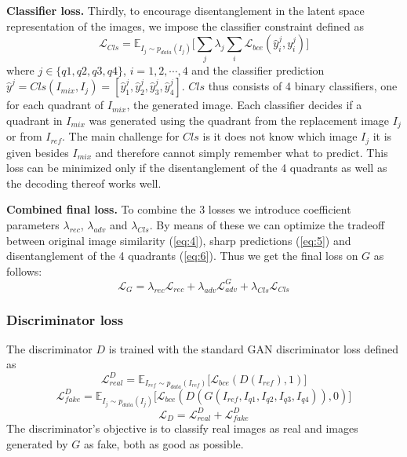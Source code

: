 \documentclass[12pt,a4paper]{article}
\begin{document}
\textbf{Classifier loss.} Thirdly, to encourage disentanglement in the latent space representation of the images, we impose the classifier constraint defined as
\begin{equation} \label{eq:cls}
    \mathcal{L}_{Cls} = \mathbb{E}_{I_{j}\sim p_{data} (I_{j})}\big[\sum_{j} \lambda_j \sum_{i} \mathcal{L}_{bce}(\hat{y}^j_i, y^j_i)\big]
\end{equation}
where $j \in \{q1,q2,q3,q4\}$, $i=1,2,\cdots,4$ and the classifier prediction $\hat{y}^j = Cls(I_{mix}, I_j) = [\hat{y}^j_1, \hat{y}^j_2, \hat{y}^j_3, \hat{y}^j_4]$. $Cls$ thus consists of 4 binary classifiers, one for each quadrant of $I_{mix}$, the generated image. Each classifier decides if a quadrant in $I_{mix}$ was generated using the quadrant from the replacement image $I_j$ or from $I_{ref}$. The main challenge for $Cls$ is it does not know which image $I_j$ it is given besides $I_{mix}$ and therefore cannot simply remember what to predict. This loss can be minimized only if the disentanglement of the 4 quadrants as well as the decoding thereof works well.

\textbf{Combined final loss.} To combine the 3 losses we introduce coefficient parameters $\lambda_{rec}$, $\lambda_{adv}$ and $\lambda_{Cls}$. By means of these we can optimize the tradeoff between original image similarity (\ref{eq:4}), sharp predictions (\ref{eq:5}) and disentanglement of the 4 quadrants (\ref{eq:6}). Thus we get the final loss on $G$ as follows:
\begin{equation} \label{eq:g_loss_comp}
    \mathcal{L}_{G} = \lambda_{rec} \mathcal{L}_{rec} + \lambda_{adv} \mathcal{L}^G_{adv} + \lambda_{Cls} \mathcal{L}_{Cls}
\end{equation}

\subsubsection{Discriminator loss}
The discriminator $D$ is trained with the standard GAN discriminator loss defined as
\begin{equation} \label{eq:lorbms_D_real}
    \mathcal{L}^D_{real} = \mathbb{E}_{I_{ref}\sim p_{data} (I_{ref})}\big[ \mathcal{L}_{bce}(D(I_{ref}), 1)\big]
\end{equation}
\begin{equation} \label{eq:lorbms_D_fake}
    \mathcal{L}^D_{fake} =  \mathbb{E}_{I_{j}\sim p_{data} (I_{j})}\big[ \mathcal{L}_{bce}(D(G(I_{ref},I_{q1},I_{q2},I_{q3},I_{q4})), 0)\big]
\end{equation}
\begin{equation} \label{eq:lorbms_D}
    \mathcal{L}_{D} = \mathcal{L}^D_{real} + \mathcal{L}^D_{fake}
\end{equation}
The discriminator's objective is to classify real images as real and images generated by $G$ as fake, both as good as possible.
\end{document}
